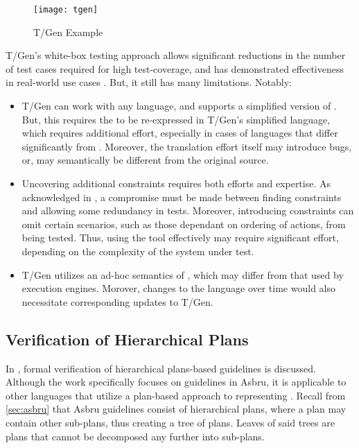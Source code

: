 \begin{figure}[th]
  \centering
  \texttt{[image: tgen]}
  \caption{T/Gen Example}\label{fig:tgen-example}
\end{figure}

T/Gen's white-box testing approach allows significant reductions in the
number of test cases required for high test-coverage, and has demonstrated
effectiveness in real-world use cases \cite{MillerJAMIA01}. But, it still has
many limitations. Notably:
\begin{itemize}
  \item T/Gen can work with any \CIG{} language, and supports
  a simplified version of \GLIF{}. But, this requires the \CIG{} to
  be re-expressed in T/Gen's simplified language,
  which requires additional effort, especially in cases of languages that differ
    significantly from \GLIF{}. Moreover, the translation effort itself may
    introduce bugs, or, may semantically be different from the original source.
  \item Uncovering additional constraints requires both efforts and expertise.
    As acknowledged in \cite{MillerJAMIA01}, a compromise must be made between
    finding constraints and allowing some redundancy in tests. Moreover,
    introducing constraints can omit certain scenarios, such
    as those dependant on ordering of actions, from being tested.
    Thus, using the tool effectively may require significant effort, depending
    on the complexity of the system under test.
  \item T/Gen utilizes an ad-hoc semantics of \GLIF{}, which may differ from
    that used by \GLIF{} execution engines. Morover, changes to the \GLIF{} language
    over time would also necessitate corresponding updates to T/Gen.
\end{itemize}

\subsection{Verification of Hierarchical Plans}\label{sec:asbru-verification}

In \cite{DuftschmidAIM01}, formal verification of hierarchical plans-based
guidelines is discussed. Although the work specifically focuses on guidelines in
Asbru, it is applicable to other languages that utilize a plan-based approach
to representing \BPGs{}. Recall from \autoref{sec:asbru} that Asbru guidelines
consist of hierarchical plans, where a plan may contain other sub-plans,
thus creating a tree of plans. Leaves of said trees are plans that cannot
be decomposed any further into sub-plans.

